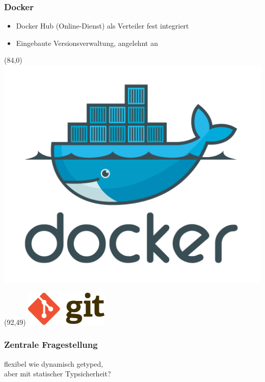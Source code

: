 \documentclass{beamer}
\begin{document}
\begin{frame}
\frametitle{Docker}

\begin{itemize}
\setlength{\itemsep}{20pt}
\item Docker Hub (Online-Dienst) als Verteiler fest integriert
\item Eingebaute Versionsverwaltung, angelehnt an
\end{itemize}

\begin{textblock}{20}(84,0)
\includegraphics[scale=0.22]{docker.png}
\end{textblock}

\begin{textblock}{20}(92,49)
\includegraphics[scale=0.22]{gitlogo.png}
\end{textblock}

\end{frame}


\begin{frame}
\frametitle{Zentrale Fragestellung}

\centering
\glqq flexibel wie dynamisch getyped,\\ aber mit statischer Typsicherheit?\grqq{}

\end{frame}
\end{document}
